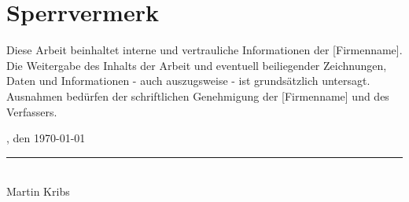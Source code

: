 \chapter*{Sperrvermerk}
\thispagestyle{empty}

Diese Arbeit beinhaltet interne und vertrauliche Informationen der [Firmenname]. Die Weitergabe des Inhalts der Arbeit und eventuell beiliegender Zeichnungen, Daten und Informationen - auch auszugsweise - ist grundsätzlich untersagt. Ausnahmen bedürfen der schriftlichen Genehmigung der [Firmenname] und des Verfassers.

\vspace{2cm}

\noindent [Ort], den \today

\vspace{2cm}

\noindent\rule{6cm}{0.4pt}\\
Martin Kribs

